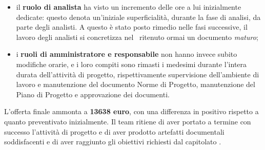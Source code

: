 \begin{itemize}
            \item il \textbf{ruolo di analista} ha visto un incremento delle ore a lui inizialmente dedicate: questo denota un'iniziale superficialità, durante la fase di analisi, da parte degli analisti. A questo è stato posto rimedio nelle fasi successive, il lavoro degli analisti si concretizza nel \AdR\ ritenuto ormai un documento \textit{maturo};
            \item i \textbf{ruoli di amministratore e responsabile} non hanno invece subito modifiche orarie, e i loro compiti sono rimasti i medesimi durante l'intera durata dell'attività di progetto, rispettivamente supervisione dell'ambiente di lavoro e manutenzione del documento Norme di Progetto, manutenzione del Piano di Progetto e approvazione dei documenti.
        \end{itemize}
        \noindent
        L'offerta finale ammonta a \textbf{13638 euro}, con una differenza in positivo rispetto a quanto preventivato inizialmente. Il team ritiene di aver portato a termine con successo l'attività di progetto e di aver prodotto artefatti documentali soddisfacenti e di aver raggiunto gli obiettivi richiesti dal capitolato \hd .
